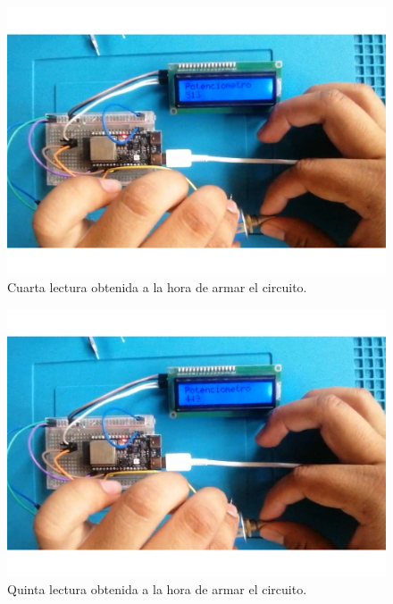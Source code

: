 \begin{figure}[H]
        \centering
        \includegraphics[trim = {45mm 15mm 80mm 20mm},clip,scale=0.5]{19/Img/evidenciaCambio4.pdf}
        \caption{Cuarta lectura obtenida a la hora de armar el circuito.}
        \label{fig:evidenciaCambio4}
    \end{figure}
        \begin{figure}[H]
        \centering
        \includegraphics[trim = {45mm 15mm 80mm 20mm},clip,scale=0.5]{19/Img/evidenciaCambio5.pdf}
        \caption{Quinta lectura obtenida a la hora de armar el circuito.}
        \label{fig:evidenciaCambio5}
    \end{figure}
